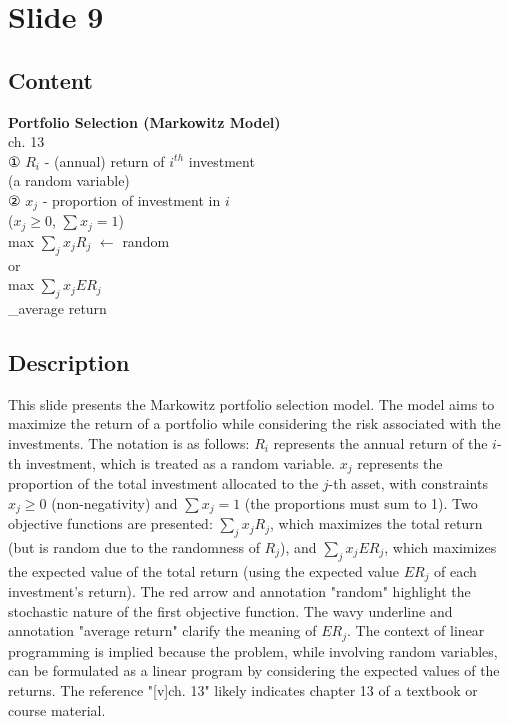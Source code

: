 \documentclass{article}%
\begin{document}
%
\newpage%
\section{Slide 9}%
\label{sec:Slide9}%
\subsection{Content}%

\textbf{Portfolio Selection (Markowitz Model)} \\
[v]ch. 13 \\
① $R_i$ - (annual) return of $i^{th}$ investment \\
(a random variable) \\
② $x_j$ - proportion of investment in $i$ \\
($x_j \ge 0$, $\sum x_j = 1$) \\
max $\sum_j x_j R_j$ $\leftarrow$ random \\
or \\
max $\sum_j x_j ER_j$ \\
\underbrace{\qquad \qquad}_{average \text{ } return}
%
\subsection{Description}%
This slide presents the Markowitz portfolio selection model.  The model aims to maximize the return of a portfolio while considering the risk associated with the investments.  The notation is as follows: $R_i$ represents the annual return of the $i$-th investment, which is treated as a random variable. $x_j$ represents the proportion of the total investment allocated to the $j$-th asset, with constraints $x_j \ge 0$ (non-negativity) and $\sum x_j = 1$ (the proportions must sum to 1). Two objective functions are presented:  $\sum_j x_j R_j$, which maximizes the total return (but is random due to the randomness of $R_j$), and $\sum_j x_j ER_j$, which maximizes the expected value of the total return (using the expected value $ER_j$ of each investment's return). The red arrow and annotation "random" highlight the stochastic nature of the first objective function. The wavy underline and annotation "average return" clarify the meaning of $ER_j$. The context of linear programming is implied because the problem, while involving random variables, can be formulated as a linear program by considering the expected values of the returns.  The reference "[v]ch. 13" likely indicates chapter 13 of a textbook or course material.%
\end{document}
